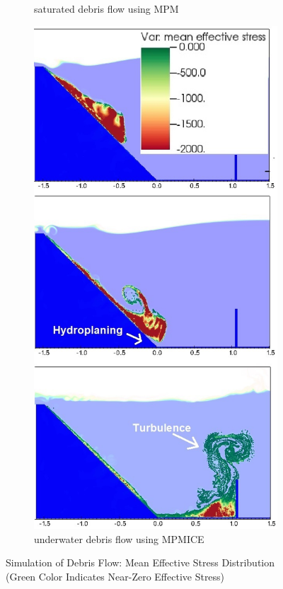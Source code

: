 \documentclass[preprint,12pt]{elsarticle}
\begin{document}
\begin{figure}[]
\begin{subfigure}[c]{0.5\linewidth}
\caption{saturated debris flow using MPM}
\label{saturatedflowa}
\end {subfigure}\hfill    
\begin{subfigure}[d]{0.5\linewidth}
\includegraphics[width=\linewidth]{MPMICE_debris.jpg}
\caption{underwater debris flow using MPMICE}
\label{saturatedflowb}
\end {subfigure}
\caption{Simulation of Debris Flow: Mean Effective Stress Distribution (Green Color Indicates Near-Zero Effective Stress)}
\label{saturatedflow}
\end {figure}
%
%
\end{document}
